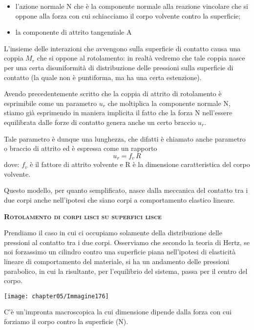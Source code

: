 \begin{itemize}
\item l'azione normale N che è la componente normale alla reazione vincolare che si oppone alla forza con cui schiacciamo il corpo volvente contro la superficie;
\item la componente di attrito tangenziale A
\end{itemize}

L'insieme delle interazioni che avvengono sulla superficie di contatto causa una coppia $M_r$ che si oppone al rotolamento: in realtà vedremo che tale coppia nasce per una certa disuniformità di distribuzione delle pressioni sulla superficie di contatto (la quale non è puntiforma, ma ha una certa estenzione).

Avendo precedentemente scritto che la coppia di attrito di rotolamento è esprimibile come un parametro $u_r$ che moltiplica la componente normale N, stiamo già esprimendo in maniera implicita il fatto che la forza N nell'essere equilibrata dalle forze di contatto genera anche un certo braccio $u_r$.

Tale parametro è dunque una lunghezza, che difatti è chiamato anche parametro o braccio di attrito ed è espressa come un rapporto
\[u_r = f_v\,R\]
dove: $f_v$ è il fattore di attrito volvente e R è la dimensione caratteristica del corpo volvente.

Questo modello, per quanto semplificato, nasce dalla meccanica del contatto tra i due corpi anche nell'ipotesi che siano corpi a comportamento elastico lineare.

\begin{center}
{\scshape{\bfseries Rotolamento di corpi lisci su superfici lisce}}
\end{center}

Prendiamo il caso in cui ci occupiamo solamente della distribuzione delle pressioni al contatto tra i due corpi. Osserviamo che secondo la teoria di Hertz, se noi forzassimo un cilindro contro una superficie piana nell'ipotesi di elasticità lineare di comportamento del materiale, si ha un andamento delle pressioni parabolico, in cui la risultante, per l'equilibrio del sistema, passa per il centro del corpo.
\begin{center}
\texttt{[image: chapter05/Immagine176]}
\end{center}

C'è un'impronta macroscopica la cui dimensione dipende dalla forza con cui forziamo il corpo contro la superficie (N).

